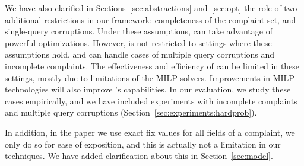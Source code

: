 We have also clarified in Sections~\ref{sec:abstractions} and~\ref{sec:opt}
the role of two additional restrictions in our framework: completeness of the
complaint set, and single-query corruptions. Under these assumptions, \sys can
take advantage of powerful optimizations. However, \sys is not restricted to
settings where these assumptions hold, and can handle cases of multiple query
corruptions and incomplete complaints. The effectiveness and efficiency of
\sys can be limited in these settings, mostly due to limitations of the MILP
solvers. Improvements in MILP technologies will also improve \sys's
capabilities. In our evaluation, we study these cases empirically, and we have
included experiments with incomplete complaints and multiple query corruptions
(Section~\ref{sec:experiments:hardprob}).

In addition, in the paper we use exact fix values for all fields of a complaint, we
only do so for ease of exposition, and this is actually not a limitation in
our techniques. We have added clarification about this in
Section~\ref{sec:model}.



\comskip